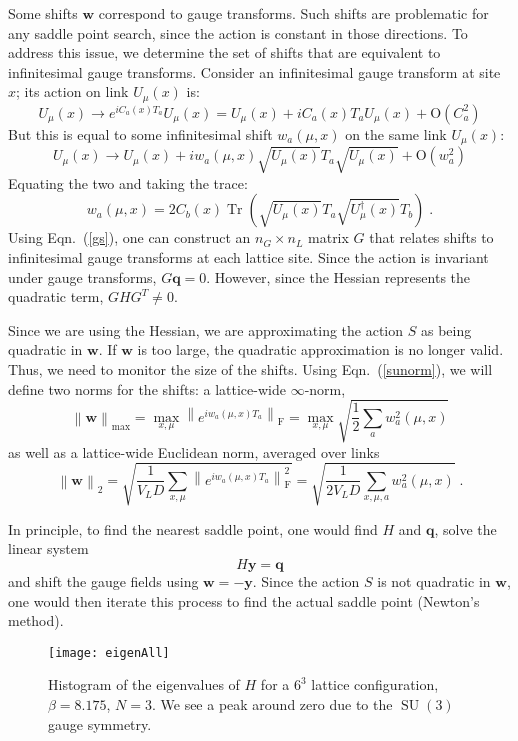 \documentclass[preprint,aps,prd]{revtex4-2}
\newcommand{\da}{\dagger}  %
\newcommand{\be}{\begin{equation}}
\newcommand{\eq}{\end{equation}}
\DeclareMathOperator{\SU}{SU}
\DeclareMathOperator{\Tr}{Tr}
\newcommand\fnorm[1]{\left\lVert #1 \right\rVert_\mathrm{F}}
\begin{document}
Some shifts $\mathbf{w}$ correspond to gauge transforms.
Such shifts are problematic for any saddle
point search, since the action is constant in those directions.
To address this issue, we determine the set of shifts that are
equivalent to infinitesimal gauge transforms.  Consider an
infinitesimal gauge transform at site $x$; its action on link $U_\mu(x)$ is:
\be
U_\mu(x) \to e^{i C_a(x) T_a} U_\mu(x) = U_\mu(x) + i C_a(x) T_a U_\mu(x) +
       \mathrm{O}\!\left(C_a^2\right)
\eq
But this is equal to some infinitesimal shift $w_a(\mu, x)$ on
the same link $U_\mu(x)$:
\be
U_\mu(x) \to U_\mu(x) + i w_a(\mu,x) \sqrt{U_\mu(x)}T_a \sqrt{U_\mu(x)} +
       \mathrm{O}\!\left(w_a^2\right)
\eq
%
Equating the two and taking the trace:
\be
w_a(\mu,x) = 2 C_b(x) \Tr\left(\sqrt{U_\mu(x)} T_a
                     \sqrt{U_\mu^\da(x)} T_b\right) \; . \label{gs}
\eq
Using Eqn.~(\ref{gs}), one can construct an $n_G \times n_L$ matrix
$G$ that relates shifts to infinitesimal gauge transforms
at each lattice site.
Since the action is invariant under gauge transforms, $G \mathbf{q} = 0$.
However, since the Hessian represents the quadratic term, $G H G^T \neq 0$.

Since we are using the Hessian, we are approximating
the action $S$ as being quadratic in $\mathbf{w}$.  If $\mathbf{w}$
is too large, the quadratic approximation is no longer valid.
Thus, we need to monitor the size of the shifts.
Using Eqn.~(\ref{sunorm}), we will define two norms for the shifts:
a lattice-wide $\infty$-norm,
\be
\left\lVert \mathbf{w}\right\rVert_{\mathrm{max}} =
     \max_{x,\mu} \fnorm{e^{i w_{a}(\mu, x) T_a}}
     = \max_{x,\mu} \sqrt{\frac{1}{2}\sum_a w_a^2(\mu, x)}
\eq
as well as a lattice-wide Euclidean norm, averaged over links
\be
\left\lVert \mathbf{w}\right\rVert_2 =
      \sqrt{\frac{1}{V_L D} \sum_{x, \mu}
        \fnorm{e^{i w_{a}(\mu, x) T_a}}^2}
     = \sqrt{\frac{1}{2 V_L D} \sum_{x, \mu, a} w_a^2(\mu, x)}
        \; .  \label{shiftsize}
\eq


In principle, to find the nearest saddle point, one would
find $H$ and $\mathbf{q}$, solve the linear system
\be
    H \mathbf{y} = \mathbf{q} \label{linear1}
\eq
and shift the gauge fields using $\mathbf{w} = -\mathbf{y}$.
Since the action $S$ is not quadratic in $\mathbf{w}$, one
would then iterate this process to find the actual saddle point
(Newton's method).

\begin{figure}
\texttt{[image: eigenAll]}
\caption{Histogram of the eigenvalues of $H$ for a $6^3$
  lattice configuration, $\beta = 8.175$, $N=3$.
  We see a peak around zero due to the $\SU(3)$ gauge symmetry.
  \label{eigenAll}}
\end{figure}
\end{document}
